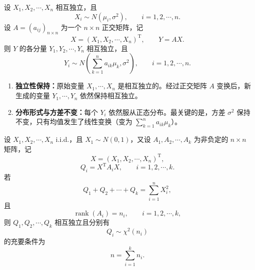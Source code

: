\begin{lemma}
设 $X_1,X_2,\cdots,X_n$ 相互独立，且
\[
X_i\sim N(\mu_i,\sigma^2),\qquad i=1,2,\cdots,n.
\]
设 $A=(a_{ij})_{n\times n}$ 为一个 $n\times n$ 正交矩阵，记
\[
X=(X_1,X_2,\cdots,X_n)^{\mathrm T},\qquad Y=AX.
\]
则 $Y$ 的各分量 $Y_1,Y_2,\cdots,Y_n$ 相互独立，且
\[
Y_i\sim N\left(\sum_{k=1}^n a_{ik}\mu_k,\sigma^2\right),\qquad i=1,2,\cdots,n.
\]
\end{lemma}
\begin{enumerate}
    \item \textbf{独立性保持：}原始变量 $X_1,\cdots,X_n$ 是相互独立的。经过正交矩阵 $A$ 变换后，新生成的变量 $Y_1,\cdots,Y_n$ 依然保持相互独立。
    
    \item \textbf{分布形式与方差不变：}每个 $Y_i$ 依然服从正态分布。最关键的是，方差 $\sigma^2$ 保持不变，只有均值发生了线性变换（变为 $\sum_{k=1}^n a_{ik}\mu_k$）。
\end{enumerate}
\begin{theorem}
设 $X_1,X_2,\cdots,X_n$ i.i.d.，且 $X_1\sim N(0,1)$，又设 $A_1,A_2,\cdots,A_k$ 为非负定的 $n\times n$ 矩阵，记
\[
X=(X_1,X_2,\cdots,X_n)^{\mathrm T},
\]
\[
Q_i=X^{\mathrm T}A_iX,\qquad i=1,2,\cdots,k.
\]
若
\[
Q_1+Q_2+\cdots+Q_k=\sum_{i=1}^n X_i^2,
\]
且
\[
\operatorname{rank}(A_i)=n_i,\qquad i=1,2,\cdots,k,
\]
则 $Q_1,Q_2,\cdots,Q_k$ 相互独立且分别有
\[
Q_i\sim \chi^2(n_i)
\]
的充要条件为
\[
n=\sum_{i=1}^k n_i.
\]
\end{theorem}

